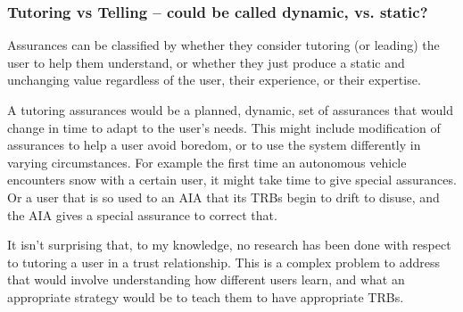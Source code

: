 \subsubsection{Tutoring vs Telling -- \textbf{could be called dynamic, vs. static?}}
    Assurances can be classified by whether they consider tutoring (or leading) the user to help them understand, or whether they just produce a static and unchanging value regardless of the user, their experience, or their expertise.

    A tutoring assurances would be a planned, dynamic, set of assurances that would change in time to adapt to the user's needs. This might include modification of assurances to help a user avoid boredom, or to use the system differently in varying circumstances. For example the first time an autonomous vehicle encounters snow with a certain user, it might take time to give special assurances. Or a user that is so used to an AIA that its TRBs begin to drift to disuse, and the AIA gives a special assurance to correct that.

    It isn't surprising that, to my knowledge, no research has been done with respect to tutoring a user in a trust relationship. This is a complex problem to address that would involve understanding how different users learn, and what an appropriate strategy would be to teach them to have appropriate TRBs.
